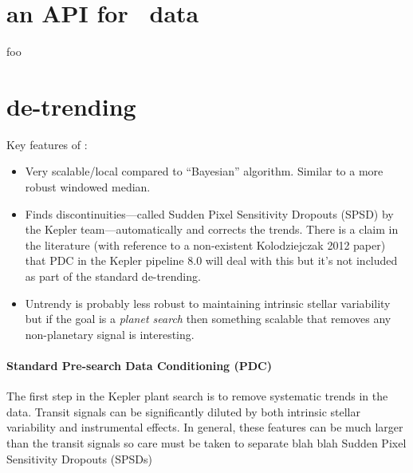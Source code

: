 \documentclass[letterpaper,12pt]{article}
\begin{document}
\section{an API for \Kepler\ data}

foo

\section{de-trending}

Key features of :
\begin{itemize}
\item Very scalable/local compared to ``Bayesian'' algorithm. Similar to
      a more robust windowed median.
\item Finds discontinuities---called Sudden Pixel Sensitivity Dropouts (SPSD)
      by the Kepler team---automatically and corrects the trends. There is a
      claim in the literature (with reference to a non-existent
      Kolodziejczak 2012 paper) that PDC in the Kepler pipeline 8.0 will deal
      with this but it's not included as part of the standard de-trending.
\item Untrendy is probably less robust to maintaining intrinsic stellar
      variability but if the goal is a \emph{planet search} then something
      scalable that removes any non-planetary signal is interesting.
\end{itemize}

\paragraph{Standard Pre-search Data Conditioning (PDC)}
The first step in the Kepler plant search is to remove systematic trends in
the data.
Transit signals can be significantly diluted by both intrinsic stellar
variability and instrumental effects. In general, these features can be much
larger than the transit signals so care must be taken to separate
blah blah Sudden Pixel Sensitivity Dropouts (SPSDs)
\end{document}
